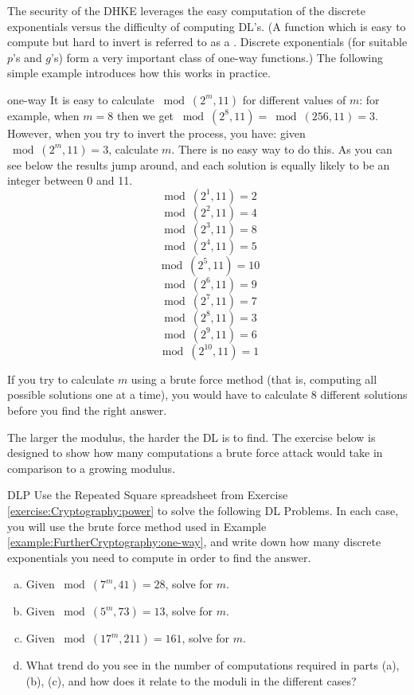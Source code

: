 The security of the DHKE leverages the easy computation of the discrete exponentials versus the difficulty of computing DL's. (A function which is easy to compute but hard to invert is referred to as a . Discrete exponentials (for suitable $p$'s and $g$'s) form a very important class of one-way functions.)
The following simple example introduces how this works in practice. 

\begin{example}{one-way}
It is easy to calculate $\bmod(2^{m},  11)$ for different values of $m$: for example, when $m =8$ then we get $\bmod(2^{8},  11) =\bmod(256,  11)  = 3$.  However, when you try to invert the process, you have: given $\bmod(2^{m},  11) = 3$, calculate $m$. There is no easy way to do this. As you can see below the results jump around, and each solution is equally likely to be an integer between 0 and 11. 
$$ \bmod(2^{1}, 11)=2$$
$$ \bmod(2^{2}, 11)=4$$
$$ \bmod(2^{3}, 11)=8$$
$$ \bmod(2^{4}, 11)=5$$
$$ \bmod(2^{5}, 11)=10$$
$$ \bmod(2^{6}, 11)=9$$
$$ \bmod(2^{7}, 11)=7$$
$$ \bmod(2^{8}, 11)=3$$
$$ \bmod(2^{9}, 11)=6$$
$$ \bmod(2^{10}, 11)=1$$
\end{example}
If you try to calculate $m$ using a brute force method (that is, computing all possible solutions one at a time), you would have to calculate 8 different solutions before you find the right answer. 

The larger the modulus, the harder the DL is to find. The exercise below is designed to show how many computations a brute force attack would take in comparison to a growing modulus.

\begin{exercise}{DLP}
Use the Repeated Square spreadsheet from Exercise \ref{exercise:Cryptography:power} to solve the following DL Problems. In each case, you will use the brute force method used in Example \ref{example:FurtherCryptography:one-way}, and write down how many discrete exponentials you need to compute in order to find the answer.  
\begin{enumerate}[(a)]
\item Given $ \bmod(7^{m}, 41)=28$, solve for $m$.

\item Given $ \bmod(5^{m}, 73)=13$, solve for $m$.

\item Given $ \bmod(17^{m}, 211)=161$, solve for $m$.

\item
What trend do you see in the number of computations required in parts (a), (b), (c), and how does it relate to the moduli in the different cases?
\end{enumerate}
\end{exercise}

